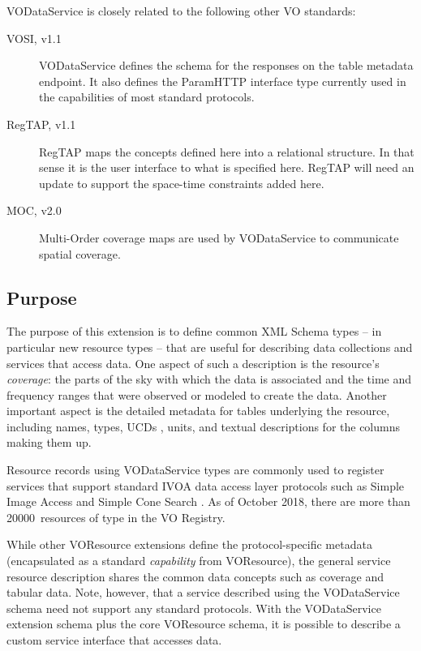 \documentclass[11pt,a4paper]{ivoa}
\begin{document}
VODataService is closely related to the following other VO standards:

\begin{description}
\item[VOSI, v1.1 \citep{2017ivoa.spec.0524G}] VODataService defines the
schema for the responses on the table metadata endpoint.  It also
defines the ParamHTTP interface type currently used in the capabilities of most
standard protocols.
\item[RegTAP, v1.1 \citep{2019ivoa.spec.1011D}] RegTAP maps the concepts
defined here into a relational structure.  In that sense it is the
user interface to what is specified here.  RegTAP will need an update
to support the space-time constraints added here.
\item[MOC, v2.0 \citep{2019ivoa.spec.1007F}] Multi-Order coverage maps
are used by VODataService to communicate spatial coverage.
\end{description}

\subsection{Purpose}


The purpose of this extension is to define common XML Schema
types -- in particular new resource types -- that are useful for describing
data collections and services that access data.  One aspect of such a
description is the resource's \emph{coverage}:  the parts of the
sky with which the data is associated and the time and frequency ranges that
were observed or modeled to create the data.  Another important aspect
is the detailed metadata for tables underlying the resource, including
names, types, UCDs
\citep{2023ivoa.spec.0125C}, units,
and textual descriptions for the columns making them up.

Resource records using VODataService types are commonly used to register
services that support standard IVOA data access layer protocols such
as Simple Image Access \citep{2015ivoa.spec.1223D} and Simple Cone Search
\citep{2008ivoa.specQ0222P}.  As of October 2018, there are more than
20000~resources of type  in the VO Registry.

While other VOResource extensions
define the protocol-specific metadata (encapsulated as a standard
\emph{capability} from VOResource), the general service
resource description shares the common data concepts such as
coverage and tabular data.  Note, however, that a service described
using the VODataService schema need not support any standard
protocols.  With the VODataService extension schema plus the core
VOResource schema, it is possible to describe a custom service
interface that accesses data.
\end{document}
